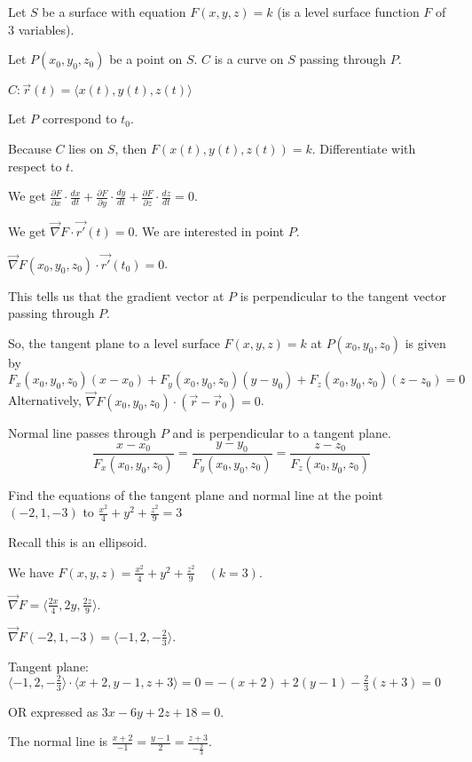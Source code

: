 \documentclass[../calc3.tex]{subfiles}
\begin{document}
Let $S$ be a surface with equation $F(x,y,z)=k$ (is a level surface function $F$ of $3$ variables).

Let $P(x_0,y_0,z_0)$ be a point on $S$. $C$ is a curve on $S$ passing through $P$.

$C:\vec{r}(t)=\langle x(t),y(t),z(t)\rangle$

Let $P$ correspond to $t_0$.

Because $C$ lies on $S$, then $F(x(t), y(t), z(t))=k$. Differentiate with respect to $t$.

We get $\frac{\partial F}{\partial x}\cdot \frac{dx}{dt}+\frac{\partial F}{\partial y}\cdot \frac{dy}{dt}+\frac{\partial F}{\partial z}\cdot \frac{dz}{dt}=0$.

We get $\vec{\nabla}F\cdot \vec{r'}(t)=0$. We are interested in point $P$.

$\vec{\nabla}F(x_0,y_0,z_0)\cdot \vec{r'}(t_0)=0$.

This tells us that the gradient vector at $P$ is perpendicular to the tangent vector passing through $P$.

So, the tangent plane to a level surface $F(x,y,z)=k$ at $P(x_0,y_0,z_0)$ is given by 
\[ F_x(x_0,y_0,z_0)(x-x_0)+F_y(x_0,y_0,z_0)(y-y_0)+F_z(x_0,y_0,z_0)(z-z_0)=0 \]
Alternatively, $\vec{\nabla}F(x_0,y_0,z_0)\cdot (\vec{r}-\vec{r}_0)=0$.

Normal line passes through $P$ and is perpendicular to a tangent plane.
\[ \frac{x-x_0}{F_x(x_0,y_0,z_0)}=\frac{y-y_0}{F_y(x_0,y_0,z_0)}=\frac{z-z_0}{F_z(x_0,y_0,z_0)}\]

\begin{example}
    Find the equations of the tangent plane and normal line at the point $(-2,1,-3)$ to $\frac{x^2}{4}+y^2+\frac{z^2}{9}=3$

    Recall this is an ellipsoid.

    We have $F(x,y,z)=\frac{x^2}{4}+y^2+\frac{z^2}{9} \quad (k=3)$.

    $\vec{\nabla}F = \langle \frac{2x}{4}, 2y, \frac{2z}{9}\rangle$.

    $\vec{\nabla}F(-2,1,-3)=\langle -1,2,-\frac{2}{3}\rangle$.

    Tangent plane: $\langle -1,2,-\frac{2}{3}\rangle \cdot \langle x+2, y-1,z+3\rangle=0 = -(x+2)+2(y-1)-\frac{2}{3}(z+3)=0$

    OR expressed as $3x-6y+2z+18=0$.

    The normal line is $\frac{x+2}{-1}=\frac{y-1}{2}=\frac{z+3}{-\frac{2}{3}}$.
\end{example}
\end{document}

